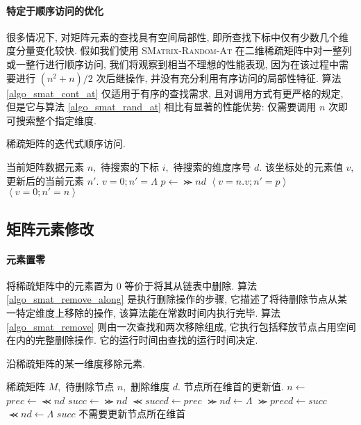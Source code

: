 \paragraph{特定于顺序访问的优化} 很多情况下, 对矩阵元素的查找具有空间局部性, 即所查找下标中仅有少数几个维度分量变化较快. 假如我们使用 \textsc{SMatrix-Random-At} 在二维稀疏矩阵中对一整列或一整行进行顺序访问, 我们将观察到相当不理想的性能表现, 因为在该过程中需要进行 $(n^2 + n) / 2$ 次后继操作, 并没有充分利用有序访问的局部性特征. 算法 \ref{algo_smat_cont_at} 仅适用于有序的查找需求, 且对调用方式有更严格的规定, 但是它与算法 \ref{algo_smat_rand_at} 相比有显著的性能优势: 仅需要调用 $n$ 次即可搜索整个指定维度.
\begin{breakablealgorithm}
\caption{稀疏矩阵的迭代式顺序访问.}
\label{algo_smat_cont_at}
\begin{algorithmic}[1]
\Require 当前矩阵数据元素 $n,$ 待搜索的下标 $i,$ 待搜索的维度序号 $d.$
\Ensure 该坐标处的元素值 $v,$ 更新后的当前元素 $n'.$
        \State \Return $v=0; n'=\Lambda$
    \EndIf
    \State $p \gets \Succ{n}{d}$
        \State \Return $\left\langle v=n.v; n'=p \right\rangle$
    \EndIf
    \State \Return $\left\langle v=0; n'=n \right\rangle$
\EndFunction
\end{algorithmic}
\end{breakablealgorithm}

\subsection{矩阵元素修改}

\paragraph{元素置零} 将稀疏矩阵中的元素置为 $0$ 等价于将其从链表中删除. 算法 \ref{algo_smat_remove_along} 是执行删除操作的步骤, 它描述了将待删除节点从某一特定维度上移除的操作, 该算法能在常数时间内执行完毕. 算法 \ref{algo_smat_remove} 则由一次查找和两次移除组成, 它执行包括释放节点占用空间在内的完整删除操作. 它的运行时间由查找的运行时间决定. 
\begin{breakablealgorithm}
\caption{沿稀疏矩阵的某一维度移除元素.}
\label{algo_smat_remove_along}
\begin{algorithmic}[1]
\Require 稀疏矩阵 $M,$ 待删除节点 $n,$ 删除维度 $d.$
\Ensure 节点所在维首的更新值.
    \State $n \gets$ 
    \State $prec \gets \Prec{n}{d}$
    \State $succ \gets \Succ{n}{d}$
        \State $\Prec{succ}{d} \gets prec$
        \State $\Succ{n}{d} \gets \Lambda$
    \EndIf
        \State $\Succ{prec}{d} \gets succ$
        \State $\Prec{n}{d} \gets \Lambda$
    \Else
        \State \Return $succ$
    \EndIf
    \State \Return 不需要更新节点所在维首
\EndFunction
\end{algorithmic}
\end{breakablealgorithm}

